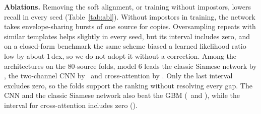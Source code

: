 \documentclass[conference]{IEEEtran}
\begin{document}
\textbf{Ablations.} Removing the soft alignment, or training without impostors, lowers recall in every seed (Table~\ref{tab:abl}).
Without impostors in training, the network takes envelope-sharing bursts of one source for copies. Oversampling repeats with
similar templates helps slightly in every seed, but its interval includes zero, and on a closed-form benchmark the same
scheme biased a learned likelihood ratio low by about 1\,dex, so we do not adopt it without a correction. Among the
architectures on the 80-source folds, model 6 leads the classic Siamese network by \OofSixMinusFive, the two-channel CNN by
\OofSixMinusFour\ and cross-attention by \OofSixMinusSeven. Only the last interval excludes zero, so the folds support the
ranking without resolving every gap. The CNN and the classic Siamese network also beat the GBM (\OofFourMinusGBM\ and
\OofFiveMinusGBM), while the interval for cross-attention includes zero (\OofSevenMinusGBM).

\begin{table}[t]
\caption{Real-data validation of model 6: validation sources on two machines, and all 80 sources with the out-of-fold
models of the test run (95\% source bootstrap where given). Empty cells were not evaluated.}
\label{tab:real}
\centering
\setlength{\tabcolsep}{2pt}
\end{table}
\end{document}
